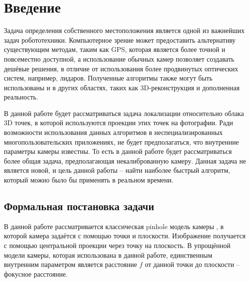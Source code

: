 \documentclass[%
bachelor,    %
natbib,      %
subf,        %
href,        %
colorlinks,  %
]{disser}
\renewcommand\maketitle{
   
   \normalfont\clearpage
}
\begin{document}
\maketitle

\tableofcontents

\newpage


\clearpage\section{Введение}

Задача определения собственного местоположения является одной из важнейших задач робототехники.
Компьютерное зрение может предоставить альтернативу существующим методам, таким как GPS, которая является более точной и повсеместно доступной, а использование обычных камер позволяет создавать дешёвые решения, в отличие от использования более продвинутых оптических систем, например, лидаров.
Полученные алгоритмы также могут быть использованы и в других областях, таких как 3D-реконструкция и дополненная реальность.

В данной работе будет рассматриваться задача локализации относительно облака 3D точек, в которой используются проекции этих точек на фотографии.
Ради возможности использования данных алгоритмов в неспециализированных многопользовательских приложениях, не будет предполагаться, что внутренние параметры камеры известны. То есть в данной работе будет рассматриваться более общая задача, предполагающая некалиброванную камеру.
Данная задача не является новой, и цель данной работы -- найти наиболее быстрый алгоритм, который можно было бы применять в реальном времени.

\subsection{Формальная постановка задачи}
В данной работе рассматривается классическая pinhole модель камеры \cite{mvg}, в которой камера задаётся с помощью точки и плоскости. 
Изображение получается с помощью центральной проекции через точку на плоскость. 
В упрощённой модели камеры, которая использована в данной работе, единственным внутренним параметром является расстояние $f$ от данной точки до плоскости  -- фокусное расстояние.
\end{document}
